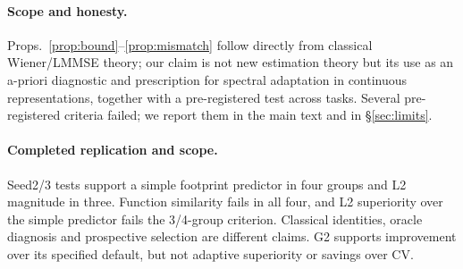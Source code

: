 \paragraph{Scope and honesty.} Props.~\ref{prop:bound}--\ref{prop:mismatch}
follow directly from classical Wiener/LMMSE theory; our claim is not new
estimation theory but its use as an a-priori diagnostic and prescription for
spectral adaptation in continuous representations, together with a
pre-registered test across tasks. Several pre-registered criteria failed; we
report them in the main text and in \S\ref{sec:limits}.

\paragraph{Completed replication and scope.} Seed2/3 tests support a simple
footprint predictor in four groups and L2 magnitude in three. Function
similarity fails in all four, and L2 superiority over the simple predictor
fails the 3/4-group criterion. Classical identities, oracle diagnosis and
prospective selection are different claims. G2 supports improvement over
its specified default, but not adaptive superiority or savings over CV.
